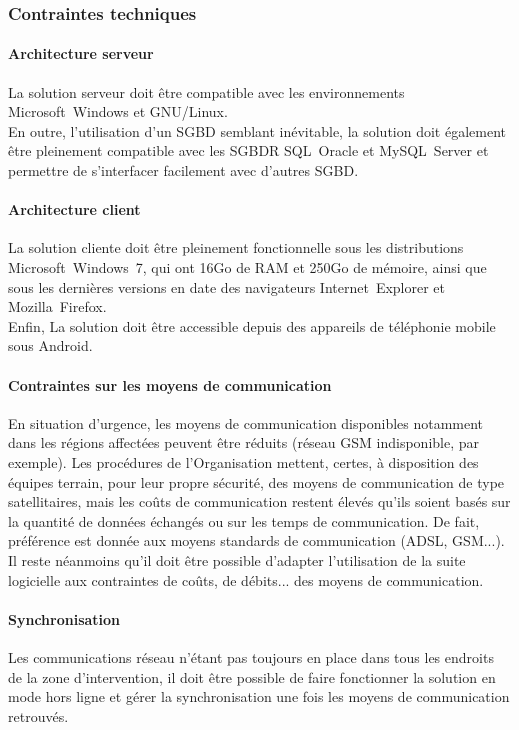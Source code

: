\subsubsection{Contraintes techniques}

\paragraph{Architecture serveur}
La solution serveur doit être compatible avec les environnements Microsoft~Windows et GNU/Linux.
\\
En outre, l'utilisation d'un SGBD semblant inévitable, la solution doit également être pleinement compatible avec les SGBDR SQL~Oracle et MySQL~Server et permettre de s'interfacer facilement avec d'autres SGBD.

\paragraph{Architecture client}
La solution cliente doit être pleinement fonctionnelle sous les distributions Microsoft~Windows~7, qui ont 16Go de RAM et 250Go de mémoire, ainsi que sous les dernières versions en date des navigateurs Internet~Explorer et Mozilla~Firefox.
\\
Enfin, La solution doit être accessible depuis des appareils de téléphonie mobile sous Android.

\paragraph{Contraintes sur les moyens de communication}
En situation d'urgence, les moyens de communication disponibles notamment dans les régions affectées peuvent être \og{}réduits\fg{} (réseau GSM indisponible, par exemple). Les procédures de l'Organisation mettent, certes, à disposition des équipes terrain, pour leur propre sécurité, des moyens de communication de type satellitaires, mais les coûts de communication restent élevés qu'ils soient basés sur la quantité de données échangés ou sur les temps de communication. De fait, préférence est donnée aux moyens \og{}standards\fg{} de communication (ADSL, GSM...). Il reste néanmoins qu'il doit être possible d'adapter l'utilisation de la suite logicielle aux contraintes de coûts, de débits... des moyens de communication.

\paragraph{Synchronisation}
Les communications réseau n'étant pas toujours en place dans tous les endroits de la zone d'intervention, il doit être possible de faire fonctionner la solution en mode \og{}hors ligne\fg{} et gérer la synchronisation une fois les moyens de communication retrouvés.

